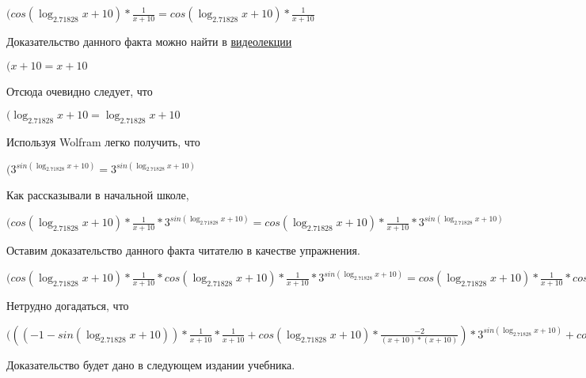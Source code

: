\documentclass[12pt,a4paper,fleqn]{article}
\theoremstyle{definition}
\begin{document}
$(cos(\log_{ 2.71828 }{ x  +  10 }) * \frac{ 1 }{ x  +  10 }
 = cos(\log_{ 2.71828 }{ x  +  10 }) * \frac{ 1 }{ x  +  10 }
$

Доказательство данного факта можно найти в \href{https://www.youtube.com/watch?v=dQw4w9WgXcQ}{видеолекции}

$( x  +  10  =  x  +  10 $

Отсюда очевидно следует, что

$(\log_{ 2.71828 }{ x  +  10 } = \log_{ 2.71828 }{ x  +  10 }$

Используя Wolfram легко получить, что

$({ 3 }^{sin(\log_{ 2.71828 }{ x  +  10 })} = { 3 }^{sin(\log_{ 2.71828 }{ x  +  10 })}$

Как рассказывали в начальной школе,

$(cos(\log_{ 2.71828 }{ x  +  10 }) * \frac{ 1 }{ x  +  10 }
 * { 3 }^{sin(\log_{ 2.71828 }{ x  +  10 })} = cos(\log_{ 2.71828 }{ x  +  10 }) * \frac{ 1 }{ x  +  10 }
 * { 3 }^{sin(\log_{ 2.71828 }{ x  +  10 })}$

Оставим доказательство данного факта читателю в качестве упражнения.

$(cos(\log_{ 2.71828 }{ x  +  10 }) * \frac{ 1 }{ x  +  10 }
 * cos(\log_{ 2.71828 }{ x  +  10 }) * \frac{ 1 }{ x  +  10 }
 * { 3 }^{sin(\log_{ 2.71828 }{ x  +  10 })} = cos(\log_{ 2.71828 }{ x  +  10 }) * \frac{ 1 }{ x  +  10 }
 * cos(\log_{ 2.71828 }{ x  +  10 }) * \frac{ 1 }{ x  +  10 }
 * { 3 }^{sin(\log_{ 2.71828 }{ x  +  10 })}$

Нетрудно догадаться, что

$((( -1  - sin(\log_{ 2.71828 }{ x  +  10 })) * \frac{ 1 }{ x  +  10 }
 * \frac{ 1 }{ x  +  10 }
 + cos(\log_{ 2.71828 }{ x  +  10 }) * \frac{ -2 }{( x  +  10 ) * ( x  +  10 )}
) * { 3 }^{sin(\log_{ 2.71828 }{ x  +  10 })} + cos(\log_{ 2.71828 }{ x  +  10 }) * \frac{ 1 }{ x  +  10 }
 * cos(\log_{ 2.71828 }{ x  +  10 }) * \frac{ 1 }{ x  +  10 }
 * { 3 }^{sin(\log_{ 2.71828 }{ x  +  10 })} = (( -1  - sin(\log_{ 2.71828 }{ x  +  10 })) * \frac{ 1 }{ x  +  10 }
 * \frac{ 1 }{ x  +  10 }
 + cos(\log_{ 2.71828 }{ x  +  10 }) * \frac{ -2 }{( x  +  10 ) * ( x  +  10 )}
) * { 3 }^{sin(\log_{ 2.71828 }{ x  +  10 })} + cos(\log_{ 2.71828 }{ x  +  10 }) * \frac{ 1 }{ x  +  10 }
 * cos(\log_{ 2.71828 }{ x  +  10 }) * \frac{ 1 }{ x  +  10 }
 * { 3 }^{sin(\log_{ 2.71828 }{ x  +  10 })}$

Доказательство будет дано в следующем издании учебника.
\end{document}

